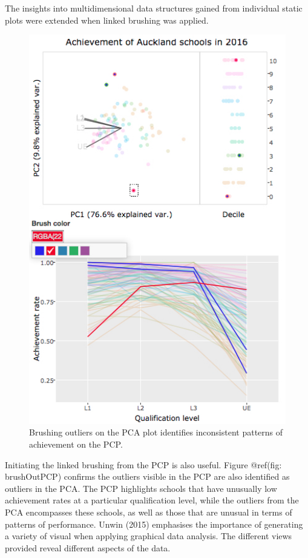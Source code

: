 \documentclass[]{book}
\theoremstyle{definition}
\theoremstyle{definition}
\theoremstyle{definition}
\theoremstyle{remark}
\begin{document}
\begin{boxed}
The insights into multidimensional data structures gained from
individual static plots were extended when linked brushing was applied.
\end{boxed}

\begin{figure}[center]
\includegraphics[width=500px]{files/link_outPCA} \caption{Brushing outliers on the PCA plot identifies inconsistent patterns of achievement on the PCP.}\label{fig:brushOutPCA}
\end{figure}

Initiating the linked brushing from the PCP is also useful. Figure
@ref(fig: brushOutPCP) confirms the outliers visible in the PCP are also
identified as outliers in the PCA. The PCP highlights schools that have
unusually low achievement rates at a particular qualification level,
while the outliers from the PCA encompasses these schools, as well as
those that are unusual in terms of patterns of performance. Unwin (2015)
emphasises the importance of generating a variety of visual when
applying graphical data analysis. The different views provided reveal
different aspects of the data.
\end{document}
